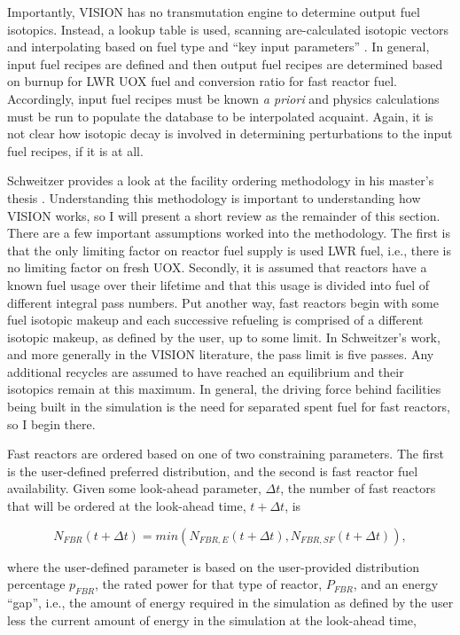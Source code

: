 Importantly, VISION has no transmutation engine to determine output fuel
isotopics. Instead, a lookup table is used, scanning are-calculated isotopic
vectors and interpolating based on fuel type and ``key input parameters''
\cite{jacobson_verifiable_2010}. In general, input fuel recipes are defined and
then output fuel recipes are determined based on burnup for LWR UOX fuel and
conversion ratio for fast reactor fuel. Accordingly, input fuel recipes must be
known \textit{a priori} and physics calculations must be run to populate the
database to be interpolated acquaint. Again, it is not clear how isotopic decay
is involved in determining perturbations to the input fuel recipes, if it is at
all.

Schweitzer provides a look at the facility ordering methodology in his master's
thesis \cite{schweitzer_improved_2008}. Understanding this methodology is
important to understanding how VISION works, so I will present a short review as
the remainder of this section. There are a few important assumptions worked into
the methodology. The first is that the only limiting factor on reactor fuel
supply is used LWR fuel, i.e., there is no limiting factor on fresh
UOX. Secondly, it is assumed that reactors have a known fuel usage over their
lifetime and that this usage is divided into fuel of different integral pass
numbers. Put another way, fast reactors begin with some fuel isotopic makeup and
each successive refueling is comprised of a different isotopic makeup, as
defined by the user, up to some limit. In Schweitzer's work, and more generally
in the VISION literature, the pass limit is five passes. Any additional recycles
are assumed to have reached an equilibrium and their isotopics remain at this
maximum. In general, the driving force behind facilities being built in the
simulation is the need for separated spent fuel for fast reactors, so I begin
there.

Fast reactors are ordered based on one of two constraining parameters. The first
is the user-defined preferred distribution, and the second is fast reactor fuel
availability. Given some look-ahead parameter, $\Delta t$, the number of fast
reactors that will be ordered at the look-ahead time, $t + \Delta t$, is

\begin{equation}
N_{FBR}\left(t+\Delta t\right) = min \left( N_{FBR,E}\left(t+\Delta t\right),N_{FBR,SF}\left(t+\Delta t\right)\right),
\end{equation}

where the user-defined parameter is based on the user-provided distribution
percentage $p_{FBR}$, the rated power for that type of reactor, $P_{FBR}$, and
an energy ``gap'', i.e., the amount of energy required in the simulation as
defined by the user less the current amount of energy in the simulation at the
look-ahead time,

